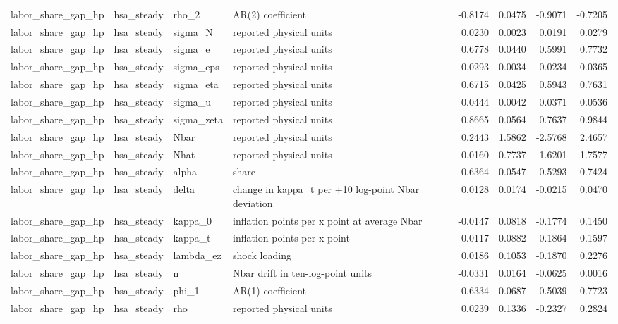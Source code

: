 \begin{tabular}{llllrrrr}
labor\_share\_gap\_hp & hsa\_steady & rho\_2 & AR(2) coefficient & -0.8174 & 0.0475 & -0.9071 & -0.7205 \\
labor\_share\_gap\_hp & hsa\_steady & sigma\_N & reported physical units & 0.0230 & 0.0023 & 0.0191 & 0.0279 \\
labor\_share\_gap\_hp & hsa\_steady & sigma\_e & reported physical units & 0.6778 & 0.0440 & 0.5991 & 0.7732 \\
labor\_share\_gap\_hp & hsa\_steady & sigma\_eps & reported physical units & 0.0293 & 0.0034 & 0.0234 & 0.0365 \\
labor\_share\_gap\_hp & hsa\_steady & sigma\_eta & reported physical units & 0.6715 & 0.0425 & 0.5943 & 0.7631 \\
labor\_share\_gap\_hp & hsa\_steady & sigma\_u & reported physical units & 0.0444 & 0.0042 & 0.0371 & 0.0536 \\
labor\_share\_gap\_hp & hsa\_steady & sigma\_zeta & reported physical units & 0.8665 & 0.0564 & 0.7637 & 0.9844 \\
labor\_share\_gap\_hp & hsa\_steady & Nbar & reported physical units & 0.2443 & 1.5862 & -2.5768 & 2.4657 \\
labor\_share\_gap\_hp & hsa\_steady & Nhat & reported physical units & 0.0160 & 0.7737 & -1.6201 & 1.7577 \\
labor\_share\_gap\_hp & hsa\_steady & alpha & share & 0.6364 & 0.0547 & 0.5293 & 0.7424 \\
labor\_share\_gap\_hp & hsa\_steady & delta & change in kappa\_t per +10 log-point Nbar deviation & 0.0128 & 0.0174 & -0.0215 & 0.0470 \\
labor\_share\_gap\_hp & hsa\_steady & kappa\_0 & inflation points per x point at average Nbar & -0.0147 & 0.0818 & -0.1774 & 0.1450 \\
labor\_share\_gap\_hp & hsa\_steady & kappa\_t & inflation points per x point & -0.0117 & 0.0882 & -0.1864 & 0.1597 \\
labor\_share\_gap\_hp & hsa\_steady & lambda\_ez & shock loading & 0.0186 & 0.1053 & -0.1870 & 0.2276 \\
labor\_share\_gap\_hp & hsa\_steady & n & Nbar drift in ten-log-point units & -0.0331 & 0.0164 & -0.0625 & 0.0016 \\
labor\_share\_gap\_hp & hsa\_steady & phi\_1 & AR(1) coefficient & 0.6334 & 0.0687 & 0.5039 & 0.7723 \\
labor\_share\_gap\_hp & hsa\_steady & rho & reported physical units & 0.0239 & 0.1336 & -0.2327 & 0.2824 \\

\end{tabular}
